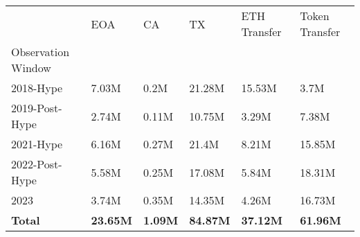 \begin{tabular}{llllll}
\toprule
 & EOA & CA & TX & ETH Transfer & Token Transfer \\
Observation Window &  &  &  &  &  \\
\midrule
2018-Hype & 7.03M & 0.2M & 21.28M & 15.53M & 3.7M \\
2019-Post-Hype & 2.74M & 0.11M & 10.75M & 3.29M & 7.38M \\
2021-Hype & 6.16M & 0.27M & 21.4M & 8.21M & 15.85M \\
2022-Post-Hype & 5.58M & 0.25M & 17.08M & 5.84M & 18.31M \\
2023 & 3.74M & 0.35M & 14.35M & 4.26M & 16.73M \\
\textbf{Total} & \textbf{23.65M} & \textbf{1.09M} & \textbf{84.87M} & \textbf{37.12M} & \textbf{61.96M} \\
\bottomrule
\end{tabular}
